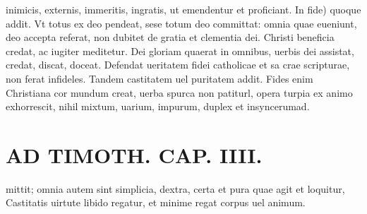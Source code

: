 \documentclass{article}
\begin{document}
\begin{pages}
inimicis, externis, immeritis, ingratis, ut emendentur et proficiant. In fide) quoque addit. Vt totus ex deo pendeat, sese totum deo committat: omnia quae eueniunt, deo accepta referat, non dubitet de gratia et clementia dei. Christi beneficia credat, ac iugiter meditetur. Dei gloriam quaerat in omnibus, uerbis dei assistat, credat, discat, doceat. Defendat ueritatem fidei catholicae et sa crae scripturae, non ferat infideles. Tandem castitatem uel puritatem addit. Fides enim Christiana cor mundum creat, uerba spurca non patiturl, opera turpia ex animo exhorrescit, nihil mixtum, uarium, impurum, duplex et insyncerumad.  \pend
{}
{}
\subsection*{\textit{}}
\section*{AD TIMOTH. CAP. IIII. }
\marginpar{[ p.511 ]}\pstart mittit; omnia autem sint simplicia, dextra, certa et pura quae agit et loquitur, Castitatis uirtute libido regatur, et minime regat corpus uel animum.  \pend
{}
{}

\end{pages}
\end{document}
